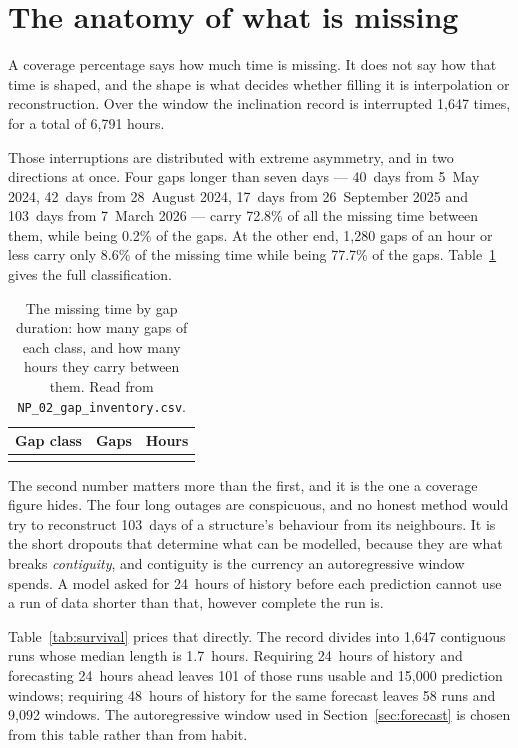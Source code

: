 \documentclass[11pt,a4paper]{article}
\begin{document}
\section{The anatomy of what is missing}
\label{sec:gaps}

A coverage percentage says how much time is missing. It does not say how that
time is shaped, and the shape is what decides whether filling it is
interpolation or reconstruction. Over the window the inclination record is
interrupted 1,647 times, for a total of 6,791 hours.

Those interruptions are distributed with extreme asymmetry, and in two
directions at once. Four gaps longer than seven days --- 40~days from 5~May
2024, 42~days from 28~August 2024, 17~days from 26~September 2025 and 103~days
from 7~March 2026 --- carry 72.8\% of all the missing time between them, while
being 0.2\% of the gaps. At the other end, 1,280 gaps of an hour or less carry
only 8.6\% of the missing time while being 77.7\% of the gaps.
Table~\ref{tab:gapclasses} gives the full classification.

\begin{table}[H]
\centering
\caption{The missing time by gap duration: how many gaps of each class, and how
many hours they carry between them. Read from
\texttt{NP\_02\_gap\_inventory.csv}.}
\label{tab:gapclasses}
\begin{tabular}{lrr}
\toprule
Gap class & Gaps & Hours \\
\midrule
\\
\bottomrule
\end{tabular}
\end{table}

The second number matters more than the first, and it is the one a coverage
figure hides. The four long outages are conspicuous, and no honest method would
try to reconstruct 103~days of a structure's behaviour from its neighbours. It
is the short dropouts that determine what can be modelled, because they are what
breaks \emph{contiguity}, and contiguity is the currency an autoregressive
window spends. A model asked for 24~hours of history before each prediction
cannot use a run of data shorter than that, however complete the run is.

Table~\ref{tab:survival} prices that directly. The record divides into 1,647
contiguous runs whose median length is 1.7~hours. Requiring 24~hours of history
and forecasting 24~hours ahead leaves 101 of those runs usable and 15,000
prediction windows; requiring 48~hours of history for the same forecast leaves
58 runs and 9,092 windows. The autoregressive window used in
Section~\ref{sec:forecast} is chosen from this table rather than from habit.
\end{document}
